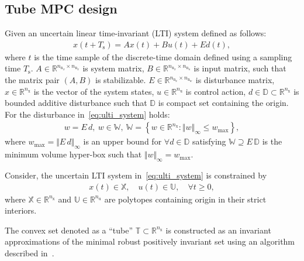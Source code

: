 \documentclass[letterpaper, 10 pt, conference]{ieeeconf}
\begin{document}
\subsection{Tube MPC design}
\label{sec:tube_mpc}

Given an uncertain linear time-invariant (LTI) system defined as follows:
\begin{eqnarray}
	\label{eq:ulti_system}
	x(t+T_{\mathrm{s}}) = A x(t) + B u(t) + E d(t), %
\end{eqnarray}
where $t$ is the time sample of the discrete-time domain defined using a sampling time $T_{\mathrm{s}}$. $A \in \mathbb{R}^{n_{\mathrm{n}_{x}} \times n_{\mathrm{n}_{x}}}$ is system matrix, $B \in \mathbb{R}^{n_{\mathrm{n}_{x}} \times n_{\mathrm{n}_{u}}}$ is input matrix, such that the matrix pair $(A,B)$ is stabilizable. $E \in \mathbb{R}^{n_{\mathrm{n}_{x}} \times n_{\mathrm{n}_{w}}}$ is disturbance matrix, $x \in \mathbb{R}^{n_{\mathrm{x}}}$ is the vector of the system states, $u \in \mathbb{R}^{n_{\mathrm{u}}}$ is control action, $d \in \mathbb{D} \subset \mathbb{R}^{n_{\mathrm{x}}}$ is bounded additive disturbance such that $\mathbb{D}$ is compact set containing the origin. 
For the disturbance in~\eqref{eq:ulti_system} holds:
\begin{eqnarray}
	\label{eq:disturbance_set}
	w = E \, d, ~ w \in \mathbb{W}, ~ \mathbb{W} = \left\{ w \in \mathbb{R}^{n_{\mathrm{x}}} : \Vert w \Vert_{\infty} \leq w_{\max} \right\},
\end{eqnarray}
where $w_{\max} = \Vert E \, d \Vert_{\infty}$ is an upper bound for $\forall d \in \mathbb{D}$ satisfying $\mathbb{W} \supseteq E \, \mathbb{D}$ is the minimum volume hyper-box such that $\Vert w \Vert_{\infty} = w_{\max}$.

Consider, the uncertain LTI system in~\eqref{eq:ulti_system} is constrained by
\begin{eqnarray}
	\label{eq:constraints_x_u}
	x(t) \in \mathbb{X}, \quad u(t) \in \mathbb{U}, \quad \forall t \geq 0,
\end{eqnarray}
where $\mathbb{X} \in \mathbb{R}^{n_{\mathrm{x}}}$ and $\mathbb{U} \in \mathbb{R}^{n_{\mathrm{u}}}$ are polytopes containing origin in their strict interiors. 

The convex set denoted as a ``tube'' $\mathbb{T} \subset \mathbb{R}^{n_{\mathrm{x}}}$ is  constructed as an invariant approximations of the minimal robust positively invariant set using an algorithm described in~\cite{RK05}.

\end{document}
